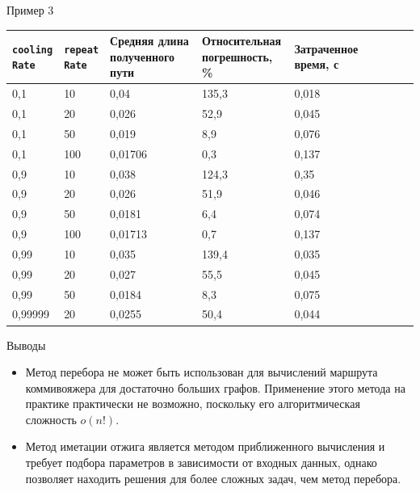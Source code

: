 \documentclass[ignoreonframetext,unicode]{beamer}
\begin{document}
\begin{frame}{Пример 3}
	
\begin{table}[h]
	\small{
	\begin{center}
		\begin{tabular}{|p{0.11\linewidth}|p{0.09\linewidth}|p{0.25\linewidth}|p{0.23\linewidth}|p{0.14\linewidth}|
				p{0.2\linewidth}|} \hline
			\texttt{cooling Rate} & \texttt{repeat Rate} & Средняя длина полученного пути & Относительная погрешность, \% & Затраченное время, с\\ \hline
			0,1 & 10   & 0,04 & 135,3  & 0,018 \\ \hline
			0,1 & 20   & 0,026 & 52,9    & 0,045 \\ \hline
			0,1 & 50   & 0,019 & 8,9    & 0,076 \\ \hline
			0,1 & 100   & 0,01706 & 0,3    & 0,137 \\ \hline
			0,9 & 10    & 0,038 & 124,3 & 0,35 \\ \hline
			0,9 & 20   & 0,026 & 51,9    & 0,046 \\ \hline
			0,9 & 50   & 0,0181 & 6,4    & 0,074 \\ \hline
			0,9 & 100   & 0,01713 & 0,7    & 0,137 \\ \hline
			0,99 & 10  & 0,035 & 139,4     & 0,035 \\ \hline
			0,99 & 20   & 0,027 & 55,5    & 0,045 \\ \hline
			0,99 &  50   & 0,0184 & 8,3    & 0,075 \\ \hline
			0,99999 & 20   & 0,0255 & 50,4    & 0,044 \\ \hline
		\end{tabular}
	\end{center}
}
\end{table}

\end{frame}	

\begin{frame}{Выводы}
	\begin{itemize}
		
	\item Метод перебора не может быть использован для вычислений маршрута коммивояжера для достаточно больших графов. Применение этого метода на практике практически не возможно, поскольку его алгоритмическая сложность $o(n!)$.
	
	\item Метод иметации отжига является методом приближенного вычисления и требует подбора параметров в зависимости от входных данных, однако позволяет находить решения для более сложных задач, чем метод перебора.
	\end{itemize}
\end{frame}
\end{document}

